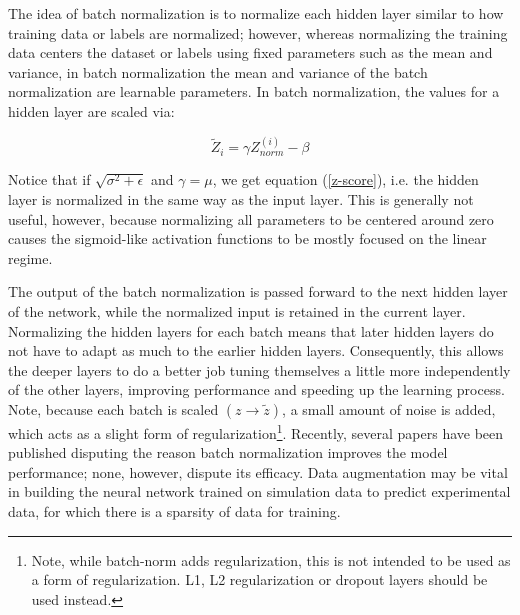 The idea of batch normalization is to normalize each hidden layer similar to how training data or labels are normalized; however, whereas normalizing the training data centers the dataset or labels using fixed parameters such as the mean and variance, in batch normalization the mean and variance of the batch normalization are learnable parameters. In batch normalization, the values for a hidden layer are scaled via:

\begin{equation}
\widetilde{Z}_i = \gamma Z_{norm}^{(i)} - \beta
\end{equation}

\noindent Notice that if $\sqrt{\sigma^2 + \epsilon}$ and $\gamma = \mu$, we get equation (\ref{z-score}), i.e. the hidden layer is normalized in the same way as the input layer. This is generally not useful, however, because normalizing all parameters to be centered around zero causes the sigmoid-like activation functions to be mostly focused on the linear regime.



The output of the batch normalization is passed forward to the next hidden layer of the network, while the normalized input is retained in the current layer. Normalizing the hidden layers for each batch means that later hidden layers do not have to adapt as much to the earlier hidden layers. Consequently, this allows the deeper layers to do a better job tuning themselves a little more independently of the other layers, improving performance and speeding up the learning process. Note, because each batch is scaled $(z \rightarrow \widetilde{z})$, a small amount of noise is added, which acts as a slight form of regularization\footnote{Note, while batch-norm adds regularization, this is not intended to be used as a form of regularization. L1, L2 regularization or dropout layers should be used instead.}. Recently, several papers  \cite{whybatchnorm1} \cite{whybatchnorm2} \cite{whybatchnorm3} have been published disputing the reason batch normalization improves the model performance; none, however, dispute its efficacy. Data augmentation may be vital in building the neural network trained on simulation data to predict experimental data, for which there is a sparsity of data for training. 

